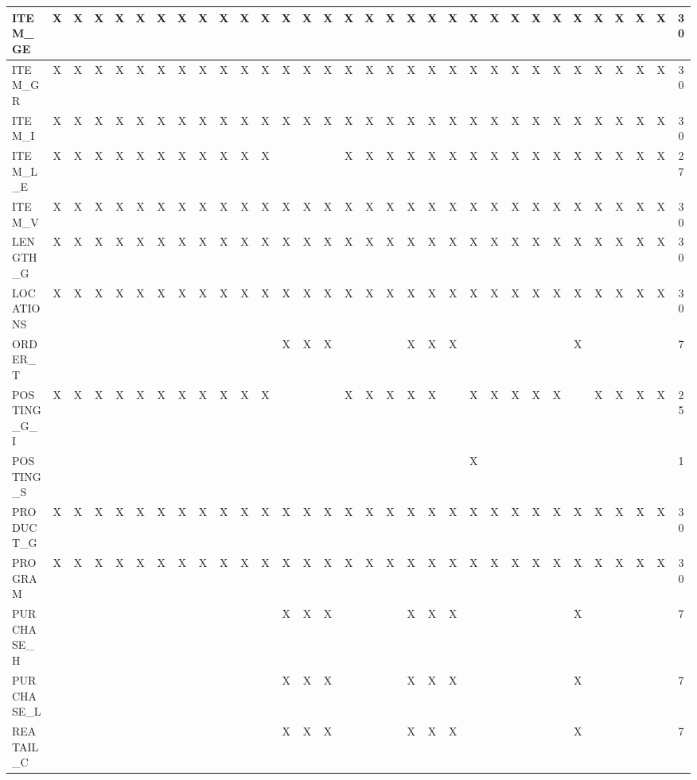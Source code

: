 \documentclass{cslthse-msc}
\begin{document}
\begin{appendices}
\begin{table}[H]
{\begin{tabular}{  l | c | c | c | c | c | c | c | c | c | c | c | c | c | c | c | c | c | c | c | c | c | c | c | c | c | c | c | c | c | c | c  }
	 ITEM\_GE & X & X & X & X & X & X & X & X & X & X & X & X & X & X & X & X & X & X & X & X & X & X & X & X & X & X & X & X & X & X & 30 \\ \hline
	 ITEM\_GR & X & X & X & X & X & X & X & X & X & X & X & X & X & X & X & X & X & X & X & X & X & X & X & X & X & X & X & X & X & X & 30 \\ \hline
	 ITEM\_I & X & X & X & X & X & X & X & X & X & X & X & X & X & X & X & X & X & X & X & X & X & X & X & X & X & X & X & X & X & X & 30 \\ \hline
	 ITEM\_L\_E & X & X & X & X & X & X & X & X & X & X & X &  &  &  & X & X & X & X & X & X & X & X & X & X & X & X & X & X & X & X & 27 \\ \hline
	 ITEM\_V & X & X & X & X & X & X & X & X & X & X & X & X & X & X & X & X & X & X & X & X & X & X & X & X & X & X & X & X & X & X & 30 \\ \hline
	 LENGTH\_G & X & X & X & X & X & X & X & X & X & X & X & X & X & X & X & X & X & X & X & X & X & X & X & X & X & X & X & X & X & X & 30 \\ \hline
	 LOCATIONS & X & X & X & X & X & X & X & X & X & X & X & X & X & X & X & X & X & X & X & X & X & X & X & X & X & X & X & X & X & X & 30 \\ \hline
	 ORDER\_T &  &  &  &  &  &  &  &  &  &  &  & X & X & X &  &  &  & X & X & X &  &  &  &  &  & X &  &  &  &  & 7 \\ \hline
	 POSTING\_G\_I & X & X & X & X & X & X & X & X & X & X & X &  &  &  & X & X & X & X & X &  & X & X & X & X & X &  & X & X & X & X & 25 \\ \hline
	 POSTING\_S &  &  &  &  &  &  &  &  &  &  &  &  &  &  &  &  &  &  &  &  & X &  &  &  &  &  &  &  &  &  & 1 \\ \hline
	 PRODUCT\_G & X & X & X & X & X & X & X & X & X & X & X & X & X & X & X & X & X & X & X & X & X & X & X & X & X & X & X & X & X & X & 30 \\ \hline
	 PROGRAM & X & X & X & X & X & X & X & X & X & X & X & X & X & X & X & X & X & X & X & X & X & X & X & X & X & X & X & X & X & X & 30 \\ \hline
	 PURCHASE\_H &  &  &  &  &  &  &  &  &  &  &  & X & X & X &  &  &  & X & X & X &  &  &  &  &  & X &  &  &  &  & 7 \\ \hline
	 PURCHASE\_L &  &  &  &  &  &  &  &  &  &  &  & X & X & X &  &  &  & X & X & X &  &  &  &  &  & X &  &  &  &  & 7 \\ \hline
	 REATAIL\_C &  &  &  &  &  &  &  &  &  &  &  & X & X & X &  &  &  & X & X & X &  &  &  &  &  & X &  &  &  &  & 7 \\ \hline

\end{tabular}}
\end{table}
\end{appendices}
\end{document}

